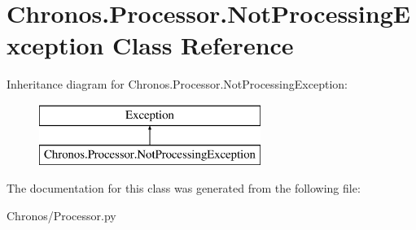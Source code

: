 \hypertarget{classChronos_1_1Processor_1_1NotProcessingException}{}\section{Chronos.\+Processor.\+Not\+Processing\+Exception Class Reference}
\label{classChronos_1_1Processor_1_1NotProcessingException}
Inheritance diagram for Chronos.\+Processor.\+Not\+Processing\+Exception\+:\begin{figure}[H]
\begin{center}
\leavevmode
\includegraphics[height=2.000000cm]{classChronos_1_1Processor_1_1NotProcessingException}
\end{center}
\end{figure}


The documentation for this class was generated from the following file\+:\begin{DoxyCompactItemize}
\item 
Chronos/Processor.\+py\end{DoxyCompactItemize}
